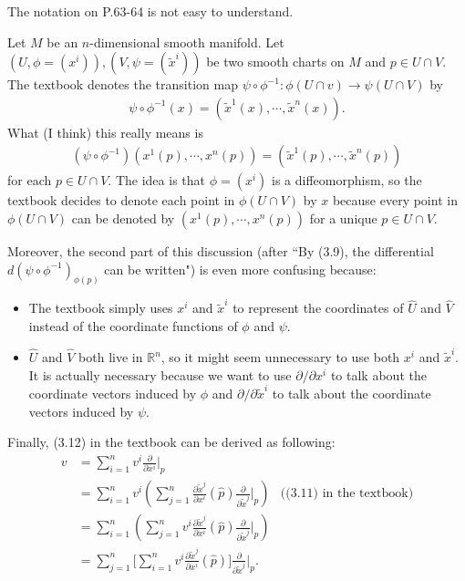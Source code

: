 \begin{rem}
  The notation on P.63-64 is not easy to understand.

  Let $M$ be an $n$-dimensional smooth manifold.
  Let $(U, \phi = (x^i)), (V, \psi = (\tilde{x}^i))$ be two smooth charts on $M$ and $p \in U \cap V$.
  The textbook denotes the transition map $\psi \circ \phi^{-1}: \phi(U \cap v) \rightarrow \psi(U \cap V)$ by
  \begin{align*}
    \psi \circ \phi^{-1}(x) = (\tilde{x}^1(x), \cdots, \tilde{x}^n(x)).
  \end{align*}
  What (I think) this really means is
  \begin{align*}
    (\psi \circ \phi^{-1})(x^1(p), \cdots, x^n(p)) = (\tilde{x}^1(p), \cdots, \tilde{x}^n(p))
  \end{align*}
  for each $p \in U \cap V$.
  The idea is that $\phi = (x^i)$ is a diffeomorphism, so the textbook decides to denote each point in $\phi(U \cap V)$ by $x$ because every point in $\phi(U \cap V)$ can be denoted by $(x^1(p), \cdots, x^n(p))$ for a unique $p \in U \cap V$.

  Moreover, the second part of this discussion (after ``By (3.9), the differential $d(\psi \circ \phi^{-1})_{\phi(p)}$ can be written") is even more confusing because:
  \begin{itemize}
    \item
      The textbook simply uses $x^i$ and $\tilde{x}^i$ to represent the coordinates of $\hat{U}$ and $\hat{V}$ instead of the coordinate functions of $\phi$ and $\psi$.
    \item
      $\hat{U}$ and $\hat{V}$ both live in $\mathbb{R}^n$, so it might seem unnecessary to use both $x^i$ and $\tilde{x}^i$.
      It is actually necessary because we want to use $\partial / \partial x^i$ to talk about the coordinate vectors induced by $\phi$ and $\partial / \partial \tilde{x}^i$ to talk about the coordinate vectors induced by $\psi$.
  \end{itemize}

  Finally, (3.12) in the textbook can be derived as following:
  \begin{align*}
    v &= \sum_{i=1}^{n} v^i \frac{\partial}{\partial x^i} \Big\vert_p \\
      &= \sum_{i=1}^{n} v^i (\sum_{j=1}^{n} \frac{\partial\tilde{x}^j}{\partial x^i}(\hat{p})\frac{\partial}{\partial \tilde{x}^j}\Big\vert_p) & \text{((3.11) in the textbook)}\\
      &= \sum_{i=1}^{n} (\sum_{j=1}^{n} v^i\frac{\partial\tilde{x}^j}{\partial x^i}(\hat{p})\frac{\partial}{\partial \tilde{x}^j}\Big\vert_p) \\
      &= \sum_{j=1}^{n} \big[\sum_{i=1}^{n} v^i\frac{\partial\tilde{x}^j}{\partial x^i}(\hat{p})\big]\frac{\partial}{\partial \tilde{x}^j}\Big\vert_p.
  \end{align*}
\end{rem}

